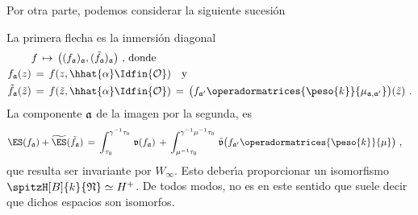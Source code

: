 Por otra parte, podemos considerar la siguiente sucesi\'{o}n
\begin{center}
\end{center}
La primera flecha es la inmersi\'{o}n diagonal
\begin{align*}
	& f\,\mapsto\,\big((f_{\frak{a}})_{\frak{a}},
		(\tilde{f}_{\frak{a}})_{\frak{a}}\big) \text{ , donde} \\
	f_{\frak{a}}(z) & \,=\, f(z,\hhat{\alpha}\Idfin{\cal{O}})
		\quad\text{y} \\
	\tilde{f}_{\frak{a}}(\tilde{z}) & \,=\,
		f(\tilde{z},\hhat{\alpha}\Idfin{\cal{O}})
		\,=\,\big(f_{\frak{a}'}\operadormatrices{\peso{k}}{%
			\mu_{\frak{a},\frak{a}'}}\big)(\tilde{z})
	\text{ .}
\end{align*}
%
La componente $\frak{a}$ de la imagen por la segunda, es
\begin{align*}
	\ES(f_{\frak{a}})+\widetilde{\ES}(\tilde{f}_{\frak{a}}) & \,=\,
		\int_{\tau_{0}}^{\gamma^{-1}\tau_{0}}\,\frak{v}(f_{\frak{a}})
		\,+\,\int_{\mu^{-1}\tau_{0}}^{\gamma^{-1}\mu^{-1}\tau_{0}}\,
			\tilde{\frak{v}}\big(f_{\frak{a}'}\operadormatrices{%
				\peso{k}}{\mu}\big)
	\text{ ,}
\end{align*}
%
que resulta ser invariante por $W_{\infty}$. Esto deber\'{\i}a proporcionar un
isomorfismo $\spitzH[B]{k}{\frak{N}}\simeq H^{+}$. De todos modos, no es en
este sentido que suele decir que dichos espacios son isomorfos.


